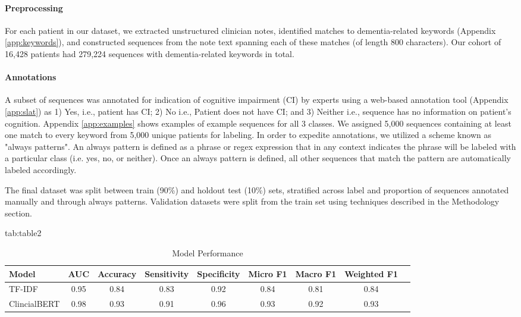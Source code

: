 \documentclass[pmlr,twocolumn,10pt]{jmlr} %
\begin{document}
\paragraph{Preprocessing}
\label{sec:Preprocessing} For each patient in our dataset, we extracted unstructured clinician notes, identified matches to dementia-related keywords (Appendix \ref{app:keywords}), and constructed sequences from the note text spanning each of these matches (of length 800 characters). Our cohort of 16,428 patients had 279,224 sequences with dementia-related keywords in total. 

\paragraph{Annotations}
\label{sec:Annotations} A subset of sequences was annotated for indication of cognitive impairment (CI) by experts using a web-based annotation tool (Appendix \ref{app:slat}) as 1) Yes, i.e., patient has CI; 2) No i.e., Patient does not have CI; and 3) Neither i.e., sequence has no information on patient’s cognition. Appendix \ref{app:examples} shows examples of example sequences for all 3 classes.  We assigned 5,000 sequences containing at least one match to every keyword from 5,000 unique patients for  labeling. In order to expedite annotations, we utilized a scheme known as "always patterns". An always pattern is defined as a phrase or regex expression that in any context indicates the phrase will be labeled with a particular class (i.e. yes, no, or neither). Once an always pattern is defined, all other sequences that match the pattern are automatically labeled accordingly.

The final dataset was split between train (90\%) and holdout test (10\%) sets, stratified across label and proportion of sequences annotated manually and through always patterns. %
Validation datasets were split from the train set using techniques described in the Methodology section. 

\begin{table*}[hbtp]
\floatconts
{tab:table2}
{\caption{Model Performance}}
\centering
  {
  \begin{tabular}{lcccccccc}
    \toprule 
    \bfseries Model & \bfseries AUC & \bfseries Accuracy & \bfseries Sensitivity & \bfseries Specificity & \bfseries Micro F1  & \bfseries Macro F1 & \bfseries Weighted F1 \\ 
    \midrule
    TF-IDF & 0.95 & 0.84 & 0.83 & 0.92 & 0.84 & 0.81 & 0.84 \\
    ClincialBERT & 0.98 & 0.93 & 0.91 & 0.96 & 0.93 & 0.92 & 0.93 \\
    \bottomrule
  \end{tabular}
  }

  \label{tab:modelperf}
\end{table*}
\end{document}
